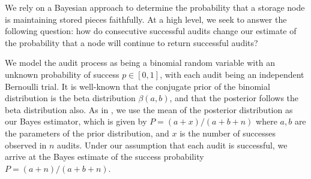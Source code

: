 We rely on a Bayesian approach to determine the probability
that a storage node is maintaining stored pieces faithfully.
At a high level, we seek to answer the following question:
how do consecutive successful audits change our estimate of
the probability that a node will continue to return successful audits?

We model the audit process as being a binomial random variable
with an unknown probability of success $p\in[0,1]$, with each audit
being an independent Bernoulli trial.
It is well-known that the conjugate prior of the binomial distribution
is the beta distribution $\beta(a,b)$,
and that the posterior follows the beta distribution also.
As in \cite{tumor-occurrence},
we use the mean of the posterior distribution as our Bayes
estimator, which is given by $P=(a+x)/(a+b+n)$ where $a,b$ are the parameters of
the prior distribution, and $x$ is the number of successes observed in $n$ audits.
Under our assumption that each audit is successful,
we arrive at the Bayes estimate of the success probability $P=(a+n)/(a+b+n)$.

